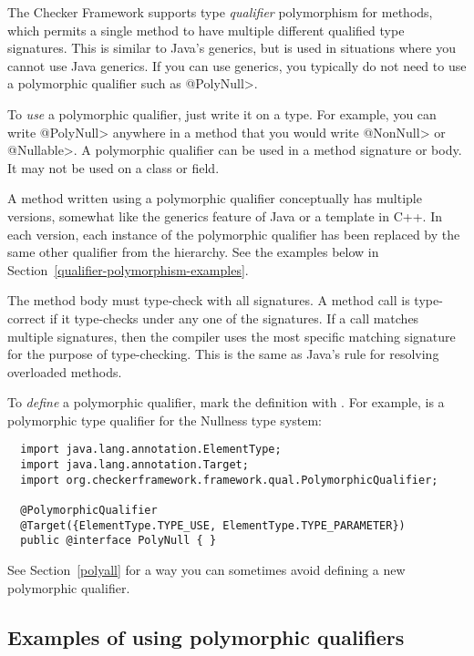The Checker Framework supports type \emph{qualifier} polymorphism for
methods, which permits a single method to have multiple different qualified
type signatures.  This is similar to Java's generics, but is used in
situations where you cannot use Java generics.  If you can use generics,
you typically do not need to use a polymorphic qualifier such as \<@PolyNull>.

To \emph{use} a polymorphic qualifier, just write it on a type.
For example, you can write \<@PolyNull> anywhere in a method that you would write
\<@NonNull> or \<@Nullable>.
A polymorphic qualifier can be used in a method signature or body.
It may not be used on a class or field.

A method written using a polymorphic qualifier conceptually has multiple
versions, somewhat like the generics feature of Java or a template in C++.
In each version, each instance of the polymorphic qualifier has been
replaced by the same other qualifier from the hierarchy.  See the examples
below in Section~\ref{qualifier-polymorphism-examples}.

The method body must type-check with all signatures.  A method call is
type-correct if it type-checks under any one of the signatures.  If a call
matches multiple signatures, then the compiler uses the most specific
matching signature for the purpose of type-checking.  This is the same as
Java's rule for resolving overloaded methods.

To \emph{define} a polymorphic qualifier, mark the definition with
.  For example,
 is a polymorphic type
qualifier for the Nullness type system:

\begin{Verbatim}
  import java.lang.annotation.ElementType;
  import java.lang.annotation.Target;
  import org.checkerframework.framework.qual.PolymorphicQualifier;

  @PolymorphicQualifier
  @Target({ElementType.TYPE_USE, ElementType.TYPE_PARAMETER})
  public @interface PolyNull { }
\end{Verbatim}

\noindent
See Section~\ref{polyall} for a way you can sometimes avoid defining a new
polymorphic qualifier.


\subsection{Examples of using polymorphic qualifiers\label{qualifier-polymorphism-examples}}

